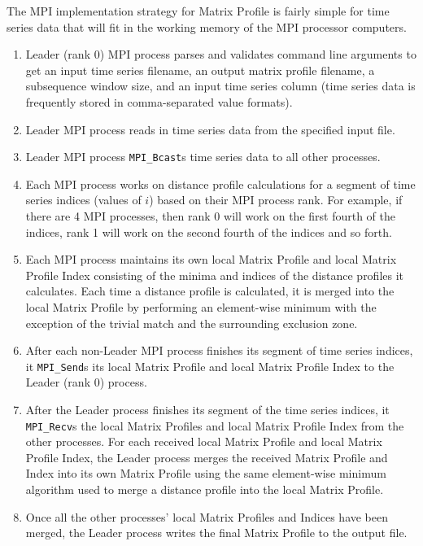 \documentclass[conference]{IEEEtran}
\begin{document}
The MPI implementation strategy for Matrix Profile is fairly simple for time series data that will fit in the working memory of the MPI processor computers.  
\begin{enumerate}
    \item Leader (rank 0) MPI process parses and validates command line arguments to get an input time series filename, an output matrix profile filename, a subsequence window size, and an input time series column (time series data is frequently stored in comma-separated value formats).
    \item Leader MPI process reads in time series data from the specified input file.
    \item Leader MPI process \texttt{MPI\_Bcast}s time series data to all other processes.
    \item Each MPI process works on distance profile calculations for a segment of time series indices (values of $i$) based on their MPI process rank.  For example, if there are 4 MPI processes, then rank 0 will work on the first fourth of the indices, rank 1 will work on the second fourth of the indices and so forth. 
    \item Each MPI process maintains its own local Matrix Profile and local Matrix Profile Index consisting of the minima and indices of the distance profiles it calculates.  Each time a distance profile is calculated, it is merged into the local Matrix Profile by performing an element-wise minimum with the exception of the trivial match and the surrounding exclusion zone.
    \item After each non-Leader MPI process finishes its segment of time series indices, it \texttt{MPI\_Send}s its local Matrix Profile and local Matrix Profile Index to the Leader (rank 0) process.
    \item After the Leader process finishes its segment of the time series indices, it \texttt{MPI\_Recv}s the local Matrix Profiles and local Matrix Profile Index from the other processes.  For each received local Matrix Profile and local Matrix Profile Index, the Leader process merges the received Matrix Profile and Index into its own Matrix Profile using the same element-wise minimum algorithm used to merge a distance profile into the local Matrix Profile.
    \item Once all the other processes' local Matrix Profiles and Indices have been merged, the Leader process writes the final Matrix Profile to the output file.
\end{enumerate}
\end{document}
